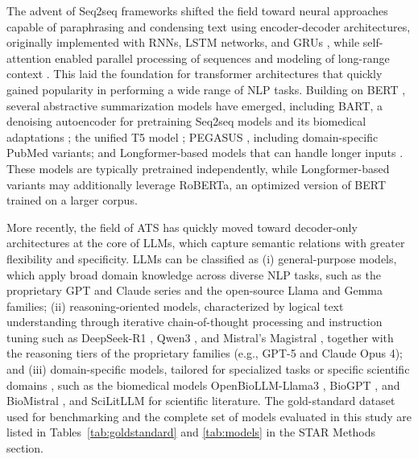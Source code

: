 The advent of \ac{Seq2seq} frameworks shifted the field toward neural approaches capable of paraphrasing and condensing text using encoder-decoder architectures, originally implemented with \acp{RNN}, \ac{LSTM} networks, and \acp{GRU} \cite{afzal2020, almasoud2022}, while self-attention enabled parallel processing of sequences and modeling of long-range context  \cite{vaswani2023attentionneed}. This laid the foundation for transformer architectures that quickly gained popularity in performing a wide range of \ac{NLP} tasks. Building on \ac{BERT} \cite{devlin2019bertpretrainingdeepbidirectional}, several abstractive summarization models have emerged, including \ac{BART}, a denoising autoencoder for pretraining \ac{Seq2seq} models \cite{DBLP:journals/corr/abs-1910-13461} and its biomedical adaptations \cite{yuan-etal-2022-biobart, abinaya2024}; the unified \ac{T5} model \cite{JMLR:v21:20-074}; \ac{PEGASUS} \cite{zhang2020pegasuspretrainingextractedgapsentences}, including domain-specific PubMed variants; and Longformer-based models \cite{Beltagy2020Longformer} that can handle longer inputs \cite{steblianko2024}. These models are typically pretrained independently, while Longformer-based variants may additionally leverage \ac{RoBERTa}, an optimized version of \ac{BERT} trained on a larger corpus.   

More recently, the field of \ac{ATS} has quickly moved toward decoder-only architectures at the core of \acp{LLM}, which capture semantic relations with greater flexibility and specificity. \acp{LLM} can be classified as (i) general-purpose models, which apply broad domain knowledge across diverse \ac{NLP} tasks, such as the proprietary \ac{GPT} \cite{Radford2018ImprovingLU} and Claude \cite{bai2022constitutionalaiharmlessnessai} series and the open-source \ac{Llama} \cite{grattafiori2024llama3herdmodels} and Gemma \cite{gemmateam2025gemma3technicalreport} families; (ii) reasoning-oriented models, characterized by logical text understanding through iterative chain-of-thought processing and instruction tuning \cite{plaat2025multistepreasoninglargelanguage} such as DeepSeek-R1 \cite{wang2025reviewdeepseekmodelskey}, Qwen3 \cite{qwen3technicalreport}, and Mistral's Magistral \cite{mistralai2025magistral}, together with the reasoning tiers of the proprietary families (e.g., GPT-5 and Claude Opus 4); and (iii) domain-specific models, tailored for specialized tasks or specific scientific domains , such as the biomedical models OpenBioLLM-Llama3 \cite{OpenBioLLMs}, BioGPT \cite{10.1093/bib/bbac409}, and BioMistral \cite{labrak2024biomistral}, and SciLitLLM \cite{li2025scilitllmadaptllmsscientific} for scientific literature. The gold-standard dataset used for benchmarking and the complete set of models evaluated in this study are listed in Tables~\ref{tab:goldstandard} and \ref{tab:models} in the STAR Methods section.

